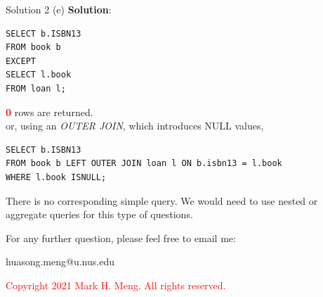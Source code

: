 \begin{frame}[fragile]{Solution 2 (e)}
\textbf{Solution}:
\begin{lstlisting}
SELECT b.ISBN13 
FROM book b
EXCEPT
SELECT l.book 
FROM loan l;
\end{lstlisting}

\vspace{5pt}
\textcolor{red}{\textbf{0}} rows are returned.\\
\vspace{10pt}
or, using an \textit{OUTER JOIN}, which introduces NULL values,

\begin{lstlisting}
SELECT b.ISBN13 
FROM book b LEFT OUTER JOIN loan l ON b.isbn13 = l.book
WHERE l.book ISNULL;
\end{lstlisting}

There is no corresponding simple query. We would need to use nested or aggregate queries for this type of questions.

\end{frame}

\begin{frame}{}
\centering  
For any further question, please feel free to email me:\vspace{10pt}

huasong.meng@u.nus.edu \vspace{20pt}

\begin{tcolorbox}
	\begin{center}
		\textcolor{red}{Copyright 2021 Mark H. Meng. All rights reserved.}
	\end{center}
\end{tcolorbox}

\end{frame}